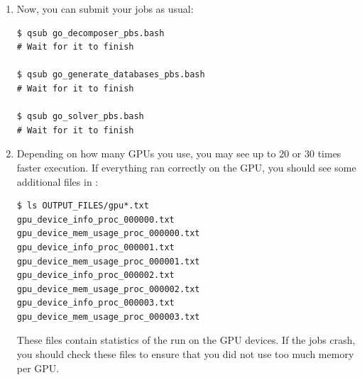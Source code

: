 \documentclass[10pt,fleqn,letterpaper]{article}
\begin{document}
\begin{enumerate}
\item Now, you can submit your jobs as usual:
\begin{lstlisting}
$ qsub go_decomposer_pbs.bash
# Wait for it to finish

$ qsub go_generate_databases_pbs.bash
# Wait for it to finish

$ qsub go_solver_pbs.bash
# Wait for it to finish
\end{lstlisting}

\item Depending on how many GPUs you use, you may see up to 20 or 30 times
      faster execution. If everything ran correctly on the GPU, you should see
      some additional files in :
\begin{lstlisting}
$ ls OUTPUT_FILES/gpu*.txt
gpu_device_info_proc_000000.txt
gpu_device_mem_usage_proc_000000.txt
gpu_device_info_proc_000001.txt
gpu_device_mem_usage_proc_000001.txt
gpu_device_info_proc_000002.txt
gpu_device_mem_usage_proc_000002.txt
gpu_device_info_proc_000003.txt
gpu_device_mem_usage_proc_000003.txt
\end{lstlisting}

      These files contain statistics of the run on the GPU devices. If the jobs
      crash, you should check these files to ensure that you did not use too
      much memory per GPU.
\end{enumerate}


%
%

\end{document}

